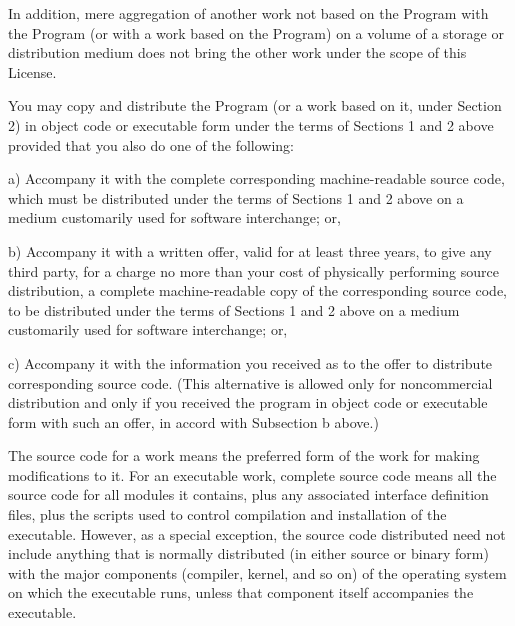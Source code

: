 In addition, mere aggregation of another work not based on the Program with the Program (or with a work based on the Program) on a volume of a storage or distribution medium does not bring the other work under the scope of this License.
\begin{DoxyEnumerate}
\item You may copy and distribute the Program (or a work based on it, under Section 2) in object code or executable form under the terms of Sections 1 and 2 above provided that you also do one of the following\-: \begin{DoxyVerb}a) Accompany it with the complete corresponding machine-readable
source code, which must be distributed under the terms of Sections
1 and 2 above on a medium customarily used for software interchange; or,

b) Accompany it with a written offer, valid for at least three
years, to give any third party, for a charge no more than your
cost of physically performing source distribution, a complete
machine-readable copy of the corresponding source code, to be
distributed under the terms of Sections 1 and 2 above on a medium
customarily used for software interchange; or,

c) Accompany it with the information you received as to the offer
to distribute corresponding source code.  (This alternative is
allowed only for noncommercial distribution and only if you
received the program in object code or executable form with such
an offer, in accord with Subsection b above.)
\end{DoxyVerb}

\end{DoxyEnumerate}

The source code for a work means the preferred form of the work for making modifications to it. For an executable work, complete source code means all the source code for all modules it contains, plus any associated interface definition files, plus the scripts used to control compilation and installation of the executable. However, as a special exception, the source code distributed need not include anything that is normally distributed (in either source or binary form) with the major components (compiler, kernel, and so on) of the operating system on which the executable runs, unless that component itself accompanies the executable.

